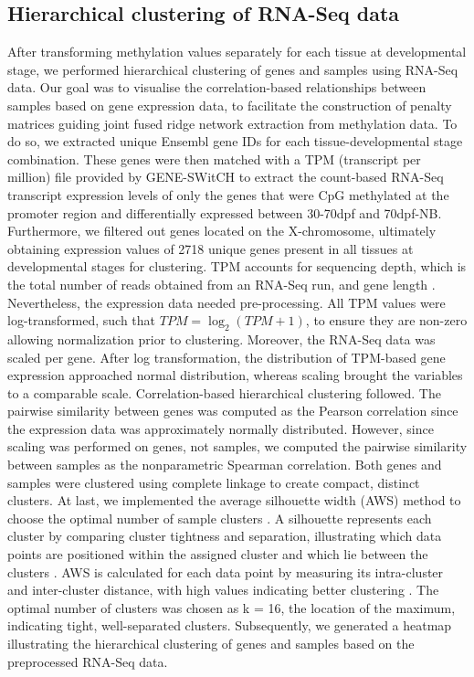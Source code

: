 \documentclass[
	a4paper, %
	10pt, %
	unnumberedsections, %
	twoside, %
]{LTJournalArticle}
\begin{document}
\subsection{\normalsize Hierarchical clustering of RNA-Seq data}\label{clust}
After transforming methylation values separately for each tissue 
at developmental stage, we performed hierarchical clustering of 
genes and samples using RNA-Seq data. Our goal was to visualise the correlation-based 
relationships between samples based on gene expression data, to facilitate the 
construction of penalty matrices guiding joint fused ridge network extraction
from methylation data. To do so, 
we extracted unique Ensembl gene IDs for each tissue-developmental stage 
combination. These genes were then matched with a TPM (transcript 
per million) file provided by GENE-SWitCH to extract the count-based RNA-Seq transcript 
expression levels of only the genes that were CpG methylated at the promoter 
region and differentially expressed between 30-70dpf and 70dpf-NB. Furthermore, we filtered out
genes located on the X-chromosome, ultimately obtaining expression values 
of 2718 unique genes present in all tissues at developmental stages for clustering.
TPM accounts for sequencing 
depth, which is the total number of reads obtained from an RNA-Seq run, and gene 
length \autocite{zhao2021a}. Nevertheless, the expression data needed pre-processing. 
All TPM values 
were log-transformed, such that \(TPM = \log_2(TPM + 1)\), to ensure they are
non-zero allowing normalization prior to clustering. 
Moreover, the RNA-Seq data was scaled per gene.
After log transformation, the distribution of TPM-based gene expression approached 
normal distribution, whereas scaling brought the variables to a comparable scale. 
Correlation-based hierarchical clustering followed. The pairwise similarity 
between genes was computed as the Pearson correlation since the expression data 
was approximately 
normally distributed. However, since scaling was performed on genes, not samples,
we computed the pairwise similarity between samples as the nonparametric Spearman 
correlation. 
Both genes and samples were clustered using complete linkage to create compact, 
distinct clusters. At last, we implemented the average silhouette width (AWS) method 
to choose the optimal number of sample clusters \autocite{batool2021a}. 
A silhouette represents each cluster by comparing cluster tightness and separation, 
illustrating which data points are positioned within 
the assigned cluster and which lie between the clusters \autocite{rousseeuw1987a}. 
AWS is calculated for each data point by measuring its intra-cluster and inter-cluster 
distance, 
with high values indicating better clustering \autocite{batool2021a}. The optimal 
number of clusters was chosen as k = 16, the location of the maximum, indicating tight, 
well-separated clusters. Subsequently, we generated a heatmap illustrating the 
hierarchical clustering of genes and samples based on the preprocessed RNA-Seq data. 
\end{document}

